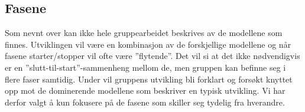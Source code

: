 \subsection{Fasene}
Som nevnt over kan ikke hele gruppearbeidet beskrives av de modellene som finnes. 
Utviklingen vil være en kombinasjon av de forskjellige modellene og når fasene starter/stopper vil ofte være ''flytende''.
Det vil si at det ikke nødvendigvis er en ''slutt-til-start''-sammenheng mellom de, men gruppen kan befinne seg i flere faser samtidig. 
Under vil gruppens utvikling bli forklart og forsøkt knyttet opp mot de dominerende modellene som beskriver en typisk utvikling. 
Vi har derfor valgt å kun fokusere på de fasene som skiller seg tydelig fra hverandre.
\vspace{\secspace}


